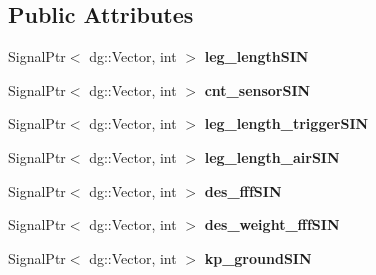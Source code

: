 \subsection*{Public Attributes}
\begin{DoxyCompactItemize}
\item 
Signal\+Ptr$<$ dg\+::\+Vector, int $>$ {\bfseries leg\+\_\+length\+S\+IN}\hypertarget{classdynamicgraph_1_1sot_1_1PowerJumpControl_a79f096ba891251435e3ffdd9e37d7146}{}\label{classdynamicgraph_1_1sot_1_1PowerJumpControl_a79f096ba891251435e3ffdd9e37d7146}

\item 
Signal\+Ptr$<$ dg\+::\+Vector, int $>$ {\bfseries cnt\+\_\+sensor\+S\+IN}\hypertarget{classdynamicgraph_1_1sot_1_1PowerJumpControl_a8e4e534a8cfe66f3c8694d543ccf7e03}{}\label{classdynamicgraph_1_1sot_1_1PowerJumpControl_a8e4e534a8cfe66f3c8694d543ccf7e03}

\item 
Signal\+Ptr$<$ dg\+::\+Vector, int $>$ {\bfseries leg\+\_\+length\+\_\+trigger\+S\+IN}\hypertarget{classdynamicgraph_1_1sot_1_1PowerJumpControl_a5d90d4751a6d7cbac379e75f18aa552b}{}\label{classdynamicgraph_1_1sot_1_1PowerJumpControl_a5d90d4751a6d7cbac379e75f18aa552b}

\item 
Signal\+Ptr$<$ dg\+::\+Vector, int $>$ {\bfseries leg\+\_\+length\+\_\+air\+S\+IN}\hypertarget{classdynamicgraph_1_1sot_1_1PowerJumpControl_a764a3c773710d43021f7357169e26a92}{}\label{classdynamicgraph_1_1sot_1_1PowerJumpControl_a764a3c773710d43021f7357169e26a92}

\item 
Signal\+Ptr$<$ dg\+::\+Vector, int $>$ {\bfseries des\+\_\+fff\+S\+IN}\hypertarget{classdynamicgraph_1_1sot_1_1PowerJumpControl_acf3aeda51c157679d846aea4d534fd5f}{}\label{classdynamicgraph_1_1sot_1_1PowerJumpControl_acf3aeda51c157679d846aea4d534fd5f}

\item 
Signal\+Ptr$<$ dg\+::\+Vector, int $>$ {\bfseries des\+\_\+weight\+\_\+fff\+S\+IN}\hypertarget{classdynamicgraph_1_1sot_1_1PowerJumpControl_a22bbb3ec98196791f646dcdd59d2a210}{}\label{classdynamicgraph_1_1sot_1_1PowerJumpControl_a22bbb3ec98196791f646dcdd59d2a210}

\item 
Signal\+Ptr$<$ dg\+::\+Vector, int $>$ {\bfseries kp\+\_\+ground\+S\+IN}\hypertarget{classdynamicgraph_1_1sot_1_1PowerJumpControl_a05cb046fa4f52dd1f25720e633012489}{}\label{classdynamicgraph_1_1sot_1_1PowerJumpControl_a05cb046fa4f52dd1f25720e633012489}


\end{DoxyCompactItemize}
